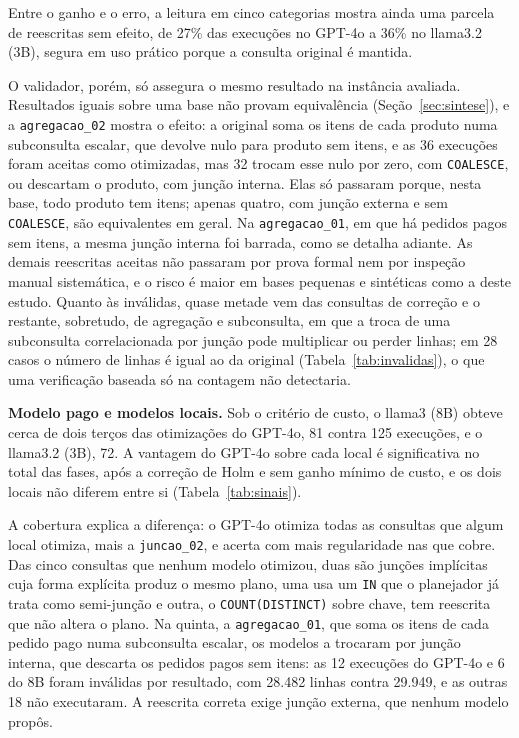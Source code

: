 \documentclass[12pt]{article}
\begin{document}
Entre o ganho e o erro, a leitura em cinco categorias mostra ainda uma parcela de reescritas sem efeito, de 27\% das execuções no GPT-4o a 36\% no llama3.2 (3B), segura em uso prático porque a consulta original é mantida.

O validador, porém, só assegura o mesmo resultado na instância avaliada. Resultados iguais sobre uma base não provam equivalência (Seção~\ref{sec:sintese}), e a \texttt{agregacao\_02} mostra o efeito: a original soma os itens de cada produto numa subconsulta escalar, que devolve nulo para produto sem itens, e as 36 execuções foram aceitas como otimizadas, mas 32 trocam esse nulo por zero, com \texttt{COALESCE}, ou descartam o produto, com junção interna. Elas só passaram porque, nesta base, todo produto tem itens; apenas quatro, com junção externa e sem \texttt{COALESCE}, são equivalentes em geral. Na \texttt{agregacao\_01}, em que há pedidos pagos sem itens, a mesma junção interna foi barrada, como se detalha adiante. As demais reescritas aceitas não passaram por prova formal nem por inspeção manual sistemática, e o risco é maior em bases pequenas e sintéticas como a deste estudo. Quanto às inválidas, quase metade vem das consultas de correção e o restante, sobretudo, de agregação e subconsulta, em que a troca de uma subconsulta correlacionada por junção pode multiplicar ou perder linhas; em 28 casos o número de linhas é igual ao da original (Tabela~\ref{tab:invalidas}), o que uma verificação baseada só na contagem não detectaria.

\textbf{Modelo pago e modelos locais.} Sob o critério de custo, o llama3 (8B) obteve cerca de dois terços das otimizações do GPT-4o, 81 contra 125 execuções, e o llama3.2 (3B), 72. A vantagem do GPT-4o sobre cada local é significativa no total das fases, após a correção de Holm e sem ganho mínimo de custo, e os dois locais não diferem entre si (Tabela~\ref{tab:sinais}).

A cobertura explica a diferença: o GPT-4o otimiza todas as consultas que algum local otimiza, mais a \texttt{juncao\_02}, e acerta com mais regularidade nas que cobre. Das cinco consultas que nenhum modelo otimizou, duas são junções implícitas cuja forma explícita produz o mesmo plano, uma usa um \texttt{IN} que o planejador já trata como semi-junção e outra, o \texttt{COUNT(DISTINCT)} sobre chave, tem reescrita que não altera o plano. Na quinta, a \texttt{agregacao\_01}, que soma os itens de cada pedido pago numa subconsulta escalar, os modelos a trocaram por junção interna, que descarta os pedidos pagos sem itens: as 12 execuções do GPT-4o e 6 do 8B foram inválidas por resultado, com 28.482 linhas contra 29.949, e as outras 18 não executaram. A reescrita correta exige junção externa, que nenhum modelo propôs.
\end{document}
